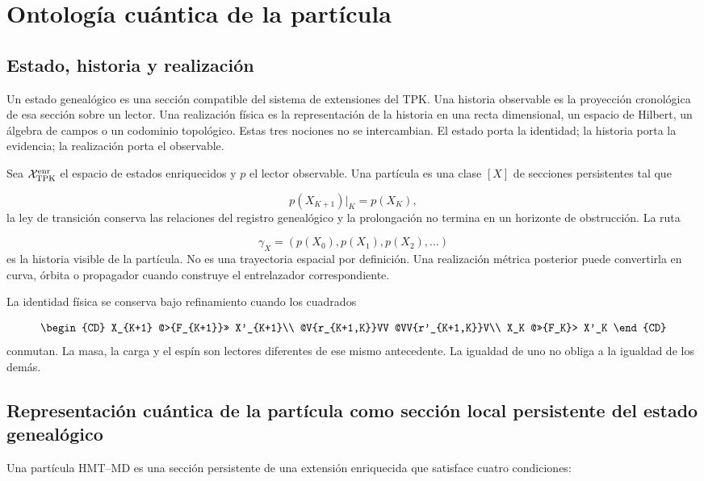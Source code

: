 \section{Ontología cuántica de la partícula}
\subsection{Estado, historia y realización}
Un estado genealógico es una sección compatible del sistema de extensiones del TPK. Una historia observable es la proyección cronológica de esa sección sobre un lector. Una realización física es la representación de la historia en una recta dimensional, un espacio de Hilbert, un álgebra de campos o un codominio topológico. Estas tres nociones no se intercambian. El estado porta la identidad; la historia porta la evidencia; la realización porta el observable.

Sea \(\mathcal X_{\rm TPK}^{\rm enr}\) el espacio de estados enriquecidos y \(p\) el lector observable. Una partícula es una clase \([X]\) de secciones persistentes tal que

\[
p(X_{K+1})|_K=p(X_K),
\]
la ley de transición conserva las relaciones del registro genealógico y la prolongación no termina en un horizonte de obstrucción. La ruta

\[
\gamma_X=(p(X_0),p(X_1),p(X_2),\ldots)
\]
es la historia visible de la partícula. No es una trayectoria espacial por definición. Una realización métrica posterior puede convertirla en curva, órbita o propagador cuando construye el entrelazador correspondiente.

La identidad física se conserva bajo refinamiento cuando los cuadrados

\[
\begin{CD}
X_{K+1} @>{F_{K+1}}>> X'_{K+1}\\
@V{r_{K+1,K}}VV @VV{r'_{K+1,K}}V\\
X_K @>>{F_K}> X'_K
\end{CD}
\]
conmutan. La masa, la carga y el espín son lectores diferentes de ese mismo antecedente. La igualdad de uno no obliga a la igualdad de los demás.

\subsection{Representación cuántica de la partícula como sección local persistente del estado genealógico}
Una partícula HMT--MD es una sección persistente de una extensión enriquecida que satisface cuatro condiciones:

